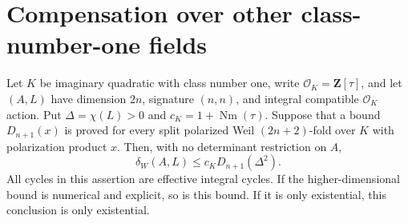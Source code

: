 \section{Compensation over other class-number-one fields}

\begin{proposition}
\label{HD-COMP}
Let $K$ be imaginary quadratic with class number one, write
$\mathcal O_K=\mathbf Z[\tau]$, and let $(A,L)$ have dimension $2n$,
signature $(n,n)$, and integral compatible $\mathcal O_K$ action.
Put $\Delta=\chi(L)>0$ and $c_K=1+\operatorname{Nm}(\tau)$.
Suppose that a bound $D_{n+1}(x)$ is proved for every split polarized
Weil $(2n+2)$-fold over $K$ with polarization product $x$.
Then, with no determinant restriction on $A$,
\[
 \delta_W(A,L)\le c_K D_{n+1}(\Delta^2).
\]
All cycles in this assertion are effective integral cycles. If the
higher-dimensional bound is numerical and explicit, so is this bound.
If it is only existential, this conclusion is only existential.
\end{proposition}
